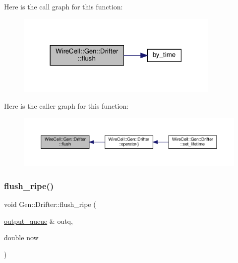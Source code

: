 Here is the call graph for this function\+:
\nopagebreak
\begin{figure}[H]
\begin{center}
\leavevmode
\includegraphics[width=278pt]{class_wire_cell_1_1_gen_1_1_drifter_aaff6334fd86eabe10bad0d0efd28dcb2_cgraph}
\end{center}
\end{figure}
Here is the caller graph for this function\+:
\nopagebreak
\begin{figure}[H]
\begin{center}
\leavevmode
\includegraphics[width=350pt]{class_wire_cell_1_1_gen_1_1_drifter_aaff6334fd86eabe10bad0d0efd28dcb2_icgraph}
\end{center}
\end{figure}
\mbox{\label{class_wire_cell_1_1_gen_1_1_drifter_adae5b8dde52b076da7ad8a9d3e3c2f29}} 
\subsubsection{\texorpdfstring{flush\+\_\+ripe()}{flush\_ripe()}}
{\footnotesize\ttfamily void Gen\+::\+Drifter\+::flush\+\_\+ripe (\begin{DoxyParamCaption}\item[{\hyperlink{class_wire_cell_1_1_i_queuedout_node_a39018e4e3dd886befac9636ac791a685}{output\+\_\+queue} \&}]{outq,  }\item[{double}]{now }\end{DoxyParamCaption})}



